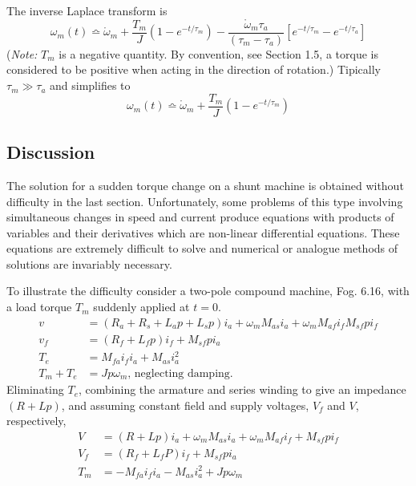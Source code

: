 \documentclass[a4paper,numbers=noenddot,12pt]{scrbook}
\begin{document}
The inverse Laplace transform is
\begin{equation}
    \omega_m(t) \bumpeq \mathring \omega_m + \dfrac{T_m}{J} (1 - e^{-t/\tau_m}) - \dfrac{\mathring \omega_m \tau_a}{(\tau_m - \tau_a)}[e^{-t/\tau_m} - e^{-t / \tau_a}]
    \label{}
\end{equation}
(\textit{Note:} $T_m$ is a negative quantity. By convention, see Section 1.5, a torque is considered to be positive when acting in the direction of rotation.)
Tipically $\tau_m \gg \tau_a$ and simplifies to
\begin{equation}
    \omega_m(t) \bumpeq \mathring \omega_m + \dfrac{T_m}{J}(1 - e^{-t/\tau_m})
    \label{eq:Eq6.73}
\end{equation}
\subsection{Discussion}
The solution for a sudden torque change on a shunt machine is obtained without difficulty in the last section. Unfortunately, some problems of this type involving simultaneous changes in speed and current produce equations with products of variables and their derivatives which are non-linear differential equations. These equations are extremely difficult to solve and numerical or analogue methods of solutions are invariably necessary.

To illustrate the difficulty consider a two-pole compound machine, Fog. 6.16, with a load torque $T_m$ suddenly applied at $t = 0$.
\begin{equation}
    \begin{aligned}
        v & =(R_a + R_s +L_a p + L_s p)i_a + \omega_m M_{as} i_a + \omega_m M_{af} i_f M_{sf} p i_f \\
        v_f & = (R_f + L_f p)i_f + M_{sf} p i_a \\
        T_e & = M_{fa} i_f i_a + M_{as}i_a^2 \\
        T_m + T_e & = J p \omega_m \text{, neglecting damping.}
    \end{aligned}
    \label{eq:Eq6.74}
\end{equation}
Eliminating $T_e$, combining the armature and series winding to give an impedance $(R + Lp)$, and assuming constant field and supply voltages, $V_f$ and $V$, respectively,
\begin{equation}
    \begin{aligned}
        V & =(R + L p)i_a + \omega_m M_{as} i_a + \omega_m M_{af}i_f + M_{sf} p i_f \\
        V_f & = (R_f +L_f P)i_f + M_{sf} p i_a \\
        T_m & = - M_{fa} i_f i_a - M_{as} i_a^2 + J p \omega_m
    \end{aligned}
    \label{eq:Eq6.75}
\end{equation}
\end{document}
